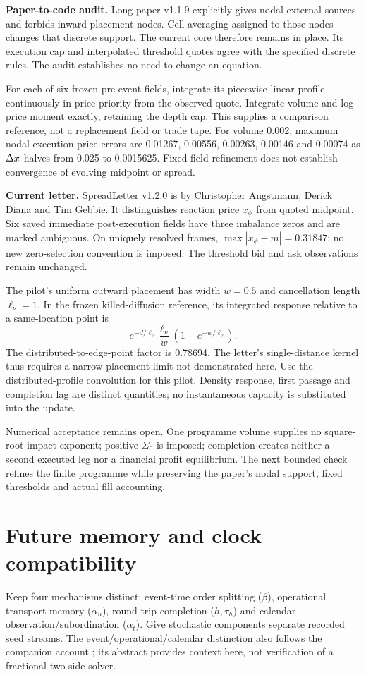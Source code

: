 \documentclass[11pt,a4paper]{article}
\begin{document}
\textbf{Paper-to-code audit.} Long-paper v1.1.9 explicitly gives nodal
external sources and forbids inward placement nodes. Cell averaging
assigned to those nodes changes that discrete support. The current core
therefore remains in place. Its execution cap and interpolated threshold
quotes agree with the specified discrete rules. The audit establishes no
need to change an equation.

For each of six frozen pre-event fields, integrate its piecewise-linear
profile continuously in price priority from the observed quote. Integrate
volume and log-price moment exactly, retaining the depth cap. This supplies
a comparison reference, not a replacement field or trade tape. For volume
0.002, maximum nodal execution-price errors are 0.01267, 0.00556, 0.00263,
0.00146 and 0.00074 as $\Delta x$ halves from 0.025 to 0.0015625. Fixed-field
refinement does not establish convergence of evolving midpoint or spread.

\textbf{Current letter.} SpreadLetter v1.2.0 is by Christopher Angstmann,
Derick Diana and Tim Gebbie. It distinguishes reaction price $x_\phi$
from quoted midpoint. Six saved immediate post-execution fields have three
imbalance zeros and are marked ambiguous. On uniquely resolved frames,
$\max|x_\phi-m|=0.31847$; no new zero-selection convention is imposed.
The threshold bid and ask observations remain unchanged.

The pilot's uniform outward placement has width $w=0.5$ and cancellation
length $\ell_\nu=1$. In the frozen killed-diffusion reference, its integrated
response relative to a same-location point is
\[
 e^{-d/\ell_\nu}\frac{\ell_\nu}{w}
 \left(1-e^{-w/\ell_\nu}\right).
\]
The distributed-to-edge-point factor is 0.78694. The letter's single-distance
kernel thus requires a narrow-placement limit not demonstrated here.
Use the distributed-profile convolution for this pilot. Density response,
first passage and completion lag are distinct quantities; no instantaneous
capacity is substituted into the update.

Numerical acceptance remains open. One programme volume supplies no
square-root-impact exponent; positive $\Sigma_0$ is imposed; completion
creates neither a second executed leg nor a financial profit equilibrium.
The next bounded check refines the finite programme while preserving the
paper's nodal support, fixed thresholds and actual fill accounting.

\newpage
\section{Future memory and clock compatibility}
Keep four mechanisms distinct: event-time order splitting ($\beta$),
operational transport memory ($\alpha_u$), round-trip completion ($h,\tau_h$)
and calendar observation/subordination ($\alpha_t$). Give stochastic
components separate recorded seed streams. The event/operational/calendar
distinction also follows the companion account \cite{clocks}; its abstract
provides context here, not verification of a fractional two-side solver.
\end{document}
